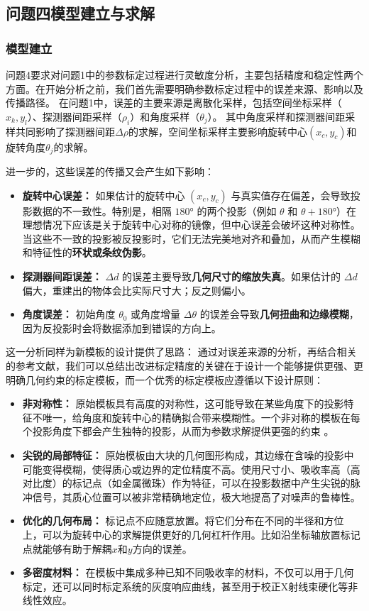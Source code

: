 \subsection{问题四模型建立与求解}
\subsubsection{模型建立}
问题4要求对问题1中的参数标定过程进行灵敏度分析，主要包括精度和稳定性两个方面。在开始分析之前，我们首先需要明确参数标定过程中的误差来源、影响以及传播路径。
在问题1中，误差的主要来源是离散化采样，包括空间坐标采样（$x_k,y_l$）、探测器间距采样（$\rho_i$）和角度采样（$\theta_j$）。
其中角度采样和探测器间距采样共同影响了探测器间距$\Delta\rho$的求解，空间坐标采样主要影响旋转中心$(x_c,y_c)$和旋转角度$\theta_j$的求解。
\par
进一步的，这些误差的传播又会产生如下影响：
\begin{itemize}
    \item \textbf{旋转中心误差：} 如果估计的旋转中心 $(x_c,y_c)$ 与真实值存在偏差，会导致投影数据的不一致性。特别是，相隔 $180°$ 的两个投影（例如 $\theta$ 和 $\theta+180°$）在理想情况下应该是关于旋转中心对称的镜像，但中心误差会破坏这种对称性。当这些不一致的投影被反投影时，它们无法完美地对齐和叠加，从而产生模糊和特征性的\textbf{环状或条纹伪影}。  
    \item \textbf{探测器间距误差：} $\Delta d$ 的误差主要导致\textbf{几何尺寸的缩放失真}。如果估计的 $\Delta d$ 偏大，重建出的物体会比实际尺寸大；反之则偏小。  
    \item \textbf{角度误差：} 初始角度 $\theta_0$ 或角度增量 $\Delta\theta$ 的误差会导致\textbf{几何扭曲和边缘模糊}，因为反投影时会将数据添加到错误的方向上。
\end{itemize}

这一分析同样为新模板的设计提供了思路：
通过对误差来源的分析，再结合相关的参考文献，我们可以总结出改进标定精度的关键在于设计一个能够提供更强、更明确几何约束的标定模板，而一个优秀的标定模板应遵循以下设计原则：
\begin{itemize}
    \item \textbf{非对称性：} 原始模板具有高度的对称性，这可能导致在某些角度下的投影特征不唯一，给角度和旋转中心的精确拟合带来模糊性。一个非对称的模板在每个投影角度下都会产生独特的投影，从而为参数求解提供更强的约束 。  
    \item \textbf{尖锐的局部特征：} 原始模板由大块的几何图形构成，其边缘在含噪的投影中可能变得模糊，使得质心或边界的定位精度不高。使用尺寸小、吸收率高（高对比度）的标记点（如金属微珠）作为特征，可以在投影数据中产生尖锐的脉冲信号，其质心位置可以被非常精确地定位，极大地提高了对噪声的鲁棒性。  
    \item \textbf{优化的几何布局：} 标记点不应随意放置。将它们分布在不同的半径和方位上，可以为旋转中心的求解提供更好的几何杠杆作用。比如沿坐标轴放置标记点就能够有助于解耦$x$和$y$方向的误差。  
    \item \textbf{多密度材料：} 在模板中集成多种已知不同吸收率的材料，不仅可以用于几何标定，还可以同时标定系统的灰度响应曲线，甚至用于校正X射线束硬化等非线性效应。
\end{itemize}


